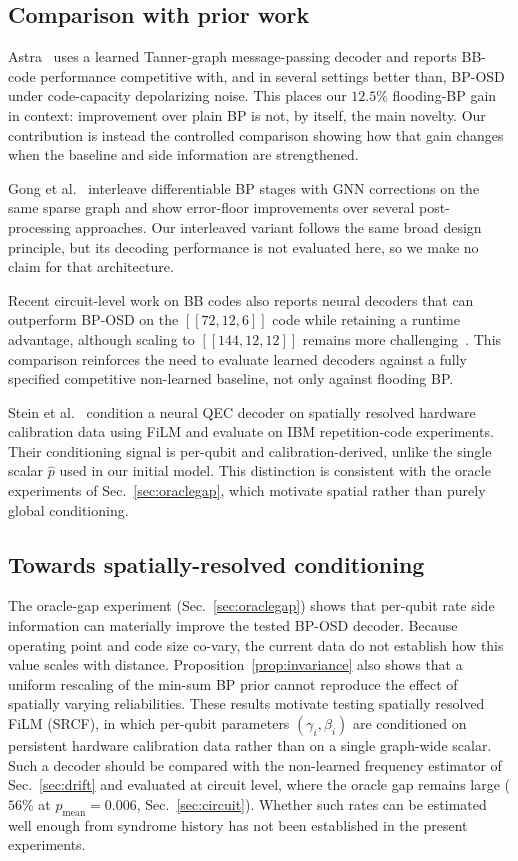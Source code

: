 \documentclass[a4paper,twocolumn,11pt,nopdfoutputerror]{quantumarticle}
\newcommand{\phat}{\hat{p}}
\newcommand{\code}[3]{\ensuremath{[\![#1,#2,#3]\!]}}
\begin{document}
\subsection{Comparison with prior work}\label{sec:priorwork}

Astra~\cite{Maan2025MLBP} uses a learned Tanner-graph message-passing
decoder and reports BB-code performance competitive with, and in several
settings better than, BP-OSD under code-capacity depolarizing noise. This
places our $12.5\%$ flooding-BP gain in context: improvement over plain BP
is not, by itself, the main novelty. Our contribution is instead the
controlled comparison showing how that gain changes when the baseline
and side information are strengthened.

Gong et al.~\cite{Gong2024GNN} interleave differentiable BP stages with
GNN corrections on the same sparse graph and show error-floor
improvements over several post-processing approaches. Our interleaved
variant follows the same broad design principle, but its decoding
performance is not evaluated here, so we make no claim for that
architecture.

Recent circuit-level work on BB codes also reports neural decoders that
can outperform BP-OSD on the $\code{72}{12}{6}$ code while retaining a
runtime advantage, although scaling to $\code{144}{12}{12}$ remains more
challenging~\cite{Blue2026MLBB}. This comparison reinforces the need to evaluate learned decoders against
a fully specified competitive non-learned baseline, not only against
flooding BP.

Stein et al.~\cite{Stein2026FiLM} condition a neural QEC decoder on
spatially resolved hardware calibration data using FiLM and evaluate on
IBM repetition-code experiments. Their conditioning signal is per-qubit
and calibration-derived, unlike the single scalar $\phat$ used in our
initial model. This distinction is consistent with the oracle experiments
of Sec.~\ref{sec:oraclegap}, which motivate spatial rather than purely
global conditioning.
\subsection{Towards spatially-resolved conditioning}\label{sec:srcf}

The oracle-gap experiment (Sec.~\ref{sec:oraclegap}) shows that
per-qubit rate side information can materially improve the tested
BP-OSD decoder. Because operating point and code size co-vary, the
current data do not establish how this value scales with distance.
Proposition~\ref{prop:invariance} also shows that a uniform rescaling
of the min-sum BP prior cannot reproduce the effect of spatially varying
reliabilities. These results motivate testing spatially resolved FiLM
(SRCF), in which per-qubit parameters $(\gamma_i, \beta_i)$ are
conditioned on persistent hardware calibration data rather than on a
single graph-wide scalar. Such a decoder should be compared with the non-learned frequency
estimator of Sec.~\ref{sec:drift} and evaluated at circuit level, where the oracle gap remains
large ($56\%$ at $p_\mathrm{mean}=0.006$, Sec.~\ref{sec:circuit}).
Whether such rates can be estimated well enough from syndrome history has
not been established in the present experiments.
\end{document}
